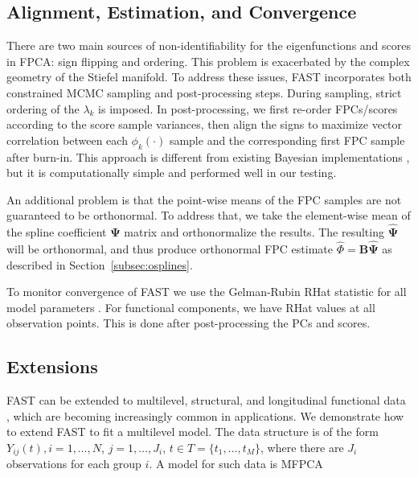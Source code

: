 \documentclass[12pt]{article}
\begin{document}
\subsection{Alignment, Estimation, and Convergence}\label{subsec:practical}

There are two main sources of non-identifiability for the eigenfunctions and scores in FPCA: sign flipping and ordering. This problem is exacerbated by the complex geometry of the Stiefel manifold. To address these issues, FAST incorporates both constrained MCMC sampling and post-processing steps. During sampling, strict ordering of the $\lambda_k$ is imposed. In post-processing, we first re-order FPCs/scores according to the score sample variances, then align the signs to maximize vector correlation between each $\phi_k(\cdot)$ sample and the corresponding first FPC sample after burn-in. This approach is different from existing Bayesian implementations \citep{goldsmith_generalized_2015, jauch_monte_2021}, but it is computationally simple and performed well in our testing.

An additional problem is that the point-wise means of the FPC samples are not guaranteed to be orthonormal. To address that, we take the element-wise mean of the spline coefficient $\boldsymbol{\Psi}$ matrix and orthonormalize the results. The resulting $\widehat{\boldsymbol{\Psi}}$ will be orthonormal, and thus produce orthonormal FPC estimate $\widehat{\Phi} = \mathbf{B}\widehat{\boldsymbol{\Psi}}$ as described in Section~\ref{subsec:osplines}.

To monitor convergence of FAST we use the Gelman-Rubin RHat statistic for all model parameters \citep{gelman_inference_1992}. For functional components, we have RHat values at all observation points. This is done after post-processing the PCs and scores.

\subsection{Extensions}\label{section:extension}
FAST can be extended to multilevel, structural, and longitudinal functional data \citep{di_multilevel_2009,greven_longitudinal_2010,shou_structured_2015}, which are becoming increasingly common in applications. We demonstrate how to extend FAST to fit a multilevel model. The data structure is of the form $Y_{ij}(t), i =1,\ldots, N$, $j=1,\ldots,J_i$, $t \in T = \{t_1, \ldots, t_M\}$, where there are $J_i$ observations for each group $i$. A model for such data is MFPCA \citep{di_multilevel_2009,Zipunnikov_HDMFPCA}
\end{document}
